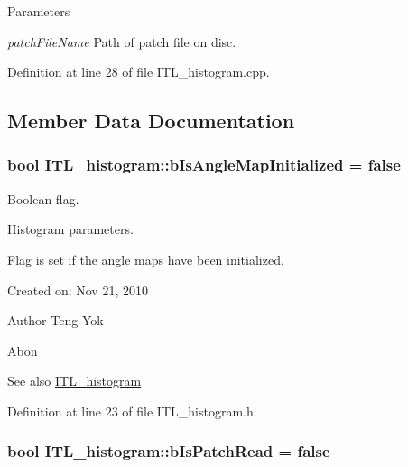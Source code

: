 \begin{DoxyParams}{Parameters}
\item[{\em patchFileName}]Path of patch file on disc. \end{DoxyParams}


Definition at line 28 of file ITL\_\-histogram.cpp.



\subsection{Member Data Documentation}
\hypertarget{classITL__histogram_ab5e8522dc950efff727735f4a8176be5}{
\subsubsection[{bIsAngleMapInitialized}]{\setlength{\rightskip}{0pt plus 5cm}bool {\bf ITL\_\-histogram::bIsAngleMapInitialized} = false}}
\label{classITL__histogram_ab5e8522dc950efff727735f4a8176be5}


Boolean flag. 

Histogram parameters.

Flag is set if the angle maps have been initialized.

Created on: Nov 21, 2010 \begin{DoxyAuthor}{Author}
Teng-\/Yok 

Abon 
\end{DoxyAuthor}
\begin{DoxySeeAlso}{See also}
\hyperlink{classITL__histogram}{ITL\_\-histogram} 
\end{DoxySeeAlso}


Definition at line 23 of file ITL\_\-histogram.h.

\hypertarget{classITL__histogram_a952fde093bb3f0e06f6504a3fd3f2115}{
\subsubsection[{bIsPatchRead}]{\setlength{\rightskip}{0pt plus 5cm}bool {\bf ITL\_\-histogram::bIsPatchRead} = false}}
\label{classITL__histogram_a952fde093bb3f0e06f6504a3fd3f2115}


